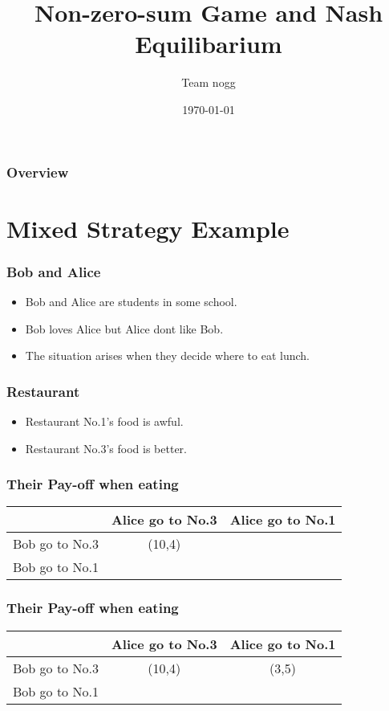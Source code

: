 \documentclass{beamer}
\title[Short title]{Non-zero-sum Game and Nash Equilibarium}
\author{Team nogg}
\institute[SJTU]
{

}
\date{\today}
\begin{document}
\begin{frame}
\titlepage
\end{frame}

\begin{frame}
\frametitle{Overview}
\tableofcontents
\end{frame}


\section{Mixed Strategy Example}
\begin{frame}
\frametitle{Bob and Alice}
\begin{itemize}
\item {\color{blue}Bob} and {\color{red} Alice} are students in some school.
\item {\color{blue}Bob} loves {\color{red} Alice} but {\color{red} Alice} dont like {\color{blue}Bob}.
\item The situation arises when they decide where to eat lunch.
\end{itemize}
\end{frame}

\begin{frame}
\frametitle{Restaurant}
\begin{itemize}
\item Restaurant No.1's food is awful.
\item Restaurant No.3's food is better.
\end{itemize}

\end{frame}

\begin{frame}
\frametitle{Their Pay-off when eating}
\begin{tabular}{|c|c|c|}
\hline
\hline
    & {\color{red}Alice} go to No.3 & {\color{red}Alice} go to No.1\\
\hline
{\color{blue}Bob} go to No.3 & ({\color{blue}10},{\color{red}4}) & \\
\hline
{\color{blue}Bob} go to No.1 &  & \\
\hline
\hline
\end{tabular}
\end{frame}

\begin{frame}
\frametitle{Their Pay-off when eating}
\begin{tabular}{|c|c|c|}
\hline
\hline
    & {\color{red}Alice} go to No.3 & {\color{red}Alice} go to No.1\\
\hline
{\color{blue}Bob} go to No.3 & ({\color{blue}10},{\color{red}4}) & ({\color{blue}3},{\color{red}5})\\
\hline
{\color{blue}Bob} go to No.1 &  & \\
\hline
\hline
\end{tabular}
\end{frame}
\end{document}
